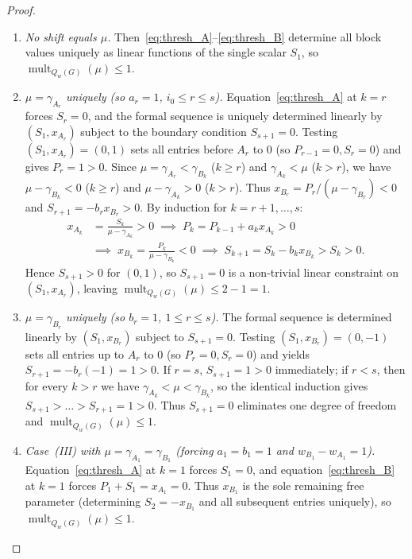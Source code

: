 \documentclass[11pt,a4paper]{article}
\theoremstyle{definition}
\DeclareMathOperator{\mult}{mult}
\begin{document}
\begin{proof}
  \begin{enumerate}
    \item \emph{No shift equals $\mu$.} Then~\eqref{eq:thresh_A}--\eqref{eq:thresh_B} determine all block values uniquely as linear functions of the single scalar $S_1$, so $\mult_{Q_w(G)}(\mu) \le 1$.
    \item \emph{$\mu = \gamma_{A_r}$ uniquely (so $a_r = 1$, $i_0 \le r \le s$).} Equation~\eqref{eq:thresh_A} at $k=r$ forces $S_r = 0$, and the formal sequence is uniquely determined linearly by $(S_1, x_{A_r})$ subject to the boundary condition $S_{s+1} = 0$. Testing $(S_1, x_{A_r}) = (0, 1)$ sets all entries before $A_r$ to $0$ (so $P_{r-1} = 0, S_r = 0$) and gives $P_r = 1 > 0$. Since $\mu = \gamma_{A_r} < \gamma_{B_k}$ ($k \ge r$) and $\gamma_{A_k} < \mu$ ($k > r$), we have $\mu - \gamma_{B_k} < 0$ ($k \ge r$) and $\mu - \gamma_{A_k} > 0$ ($k > r$). Thus $x_{B_r} = P_r/(\mu - \gamma_{B_r}) < 0$ and $S_{r+1} = -b_r x_{B_r} > 0$. By induction for $k = r+1,\dots,s$:
    \begin{align*}
      x_{A_k} &= \frac{S_k}{\mu - \gamma_{A_k}} > 0 \;\implies\; P_k = P_{k-1} + a_k x_{A_k} > 0 \\
      &\implies\; x_{B_k} = \frac{P_k}{\mu - \gamma_{B_k}} < 0 \;\implies\; S_{k+1} = S_k - b_k x_{B_k} > S_k > 0.
    \end{align*}
    Hence $S_{s+1} > 0$ for $(0, 1)$, so $S_{s+1} = 0$ is a non-trivial linear constraint on $(S_1, x_{A_r})$, leaving $\mult_{Q_w(G)}(\mu) \le 2 - 1 = 1$.
    \item \emph{$\mu = \gamma_{B_r}$ uniquely (so $b_r = 1$, $1 \le r \le s$).} The formal sequence is determined linearly by $(S_1, x_{B_r})$ subject to $S_{s+1} = 0$. Testing $(S_1, x_{B_r}) = (0, -1)$ sets all entries up to $A_r$ to $0$ (so $P_r = 0, S_r = 0$) and yields $S_{r+1} = -b_r(-1) = 1 > 0$. If $r = s$, $S_{s+1} = 1 > 0$ immediately; if $r < s$, then for every $k > r$ we have $\gamma_{A_k} < \mu < \gamma_{B_k}$, so the identical induction gives $S_{s+1} > \dots > S_{r+1} = 1 > 0$. Thus $S_{s+1} = 0$ eliminates one degree of freedom and $\mult_{Q_w(G)}(\mu) \le 1$.
    \item \emph{Case~(III) with $\mu = \gamma_{A_1} = \gamma_{B_1}$ (forcing $a_1 = b_1 = 1$ and $w_{B_1} - w_{A_1} = 1$).} Equation~\eqref{eq:thresh_A} at $k=1$ forces $S_1 = 0$, and equation~\eqref{eq:thresh_B} at $k=1$ forces $P_1 + S_1 = x_{A_1} = 0$. Thus $x_{B_1}$ is the sole remaining free parameter (determining $S_2 = -x_{B_1}$ and all subsequent entries uniquely), so $\mult_{Q_w(G)}(\mu) \le 1$.

\end{enumerate}
\end{proof}
\end{document}
